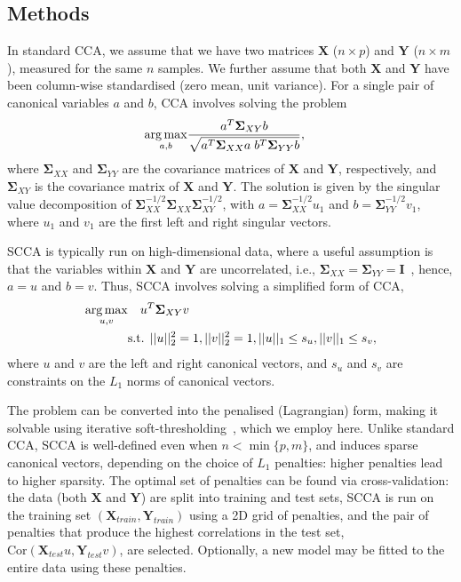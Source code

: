 \documentclass{bioinfo}
\DeclareMathOperator*{\argmax}{arg\,max}
\newcommand{\s}{\mathbf{\Sigma}}
\begin{document}
\vspace*{-12pt}
\begin{methods}
\section{Methods}

In standard CCA, we assume that we have two matrices $\mathbf{X}$ ($n \times p$)
and $\mathbf{Y}$ ($n \times m$), measured for the same $n$ samples.
We further assume that both $\mathbf{X}$ and $\mathbf{Y}$ have been
column-wise standardised (zero mean, unit variance).  For a single pair of 
canonical variables $a$ and $b$, CCA involves solving the problem
\vspace*{-10pt}
\begin{align}
\argmax_{a,b} & \frac{a^T \s_{XY} b}{\sqrt{a^T \s_{XX} a \; b^T \s_{YY} b}},
\label{eqn:cca}
\vspace*{-10pt}
\end{align}
where $\s_{XX}$ and $\s_{YY}$ are the covariance matrices of
$\mathbf{X}$ and $\mathbf{Y}$, respectively, and $\s_{XY}$ is the
covariance matrix of $\mathbf{X}$ and $\mathbf{Y}$. The solution is given by
the singular value decomposition of $\s_{XX}^{-1/2} \s_{XX}
\s_{XY}^{-1/2}$, with $a = \s_{XX}^{-1/2} u_1$ and $b =
\s_{YY}^{-1/2} v_1$, where $u_1$ and $v_1$ are the first left and right
singular vectors.

SCCA is typically run on high-dimensional data, where a useful assumption is that
the variables within $\mathbf{X}$ and $\mathbf{Y}$ are uncorrelated,
i.e., $\s_{XX}=\s_{YY}=\mathbf{I}$~\citep{Parkhomenko2009},
hence, $a = u$ and $b = v$. Thus, SCCA involves solving a simplified form of CCA,
\begin{align}
\argmax_{u,v} &  \quad u^T \s_{XY} v \notag \\
 & \mbox{s.t. } ||u||_2^2=1, ||v||_2^2 = 1, ||u||_1 \le s_u, ||v||_1 \le s_v,
\label{eqn:scca}\vspace*{-10pt}
\end{align}
where $u$ and $v$ are the left and right canonical vectors, 
and $s_u$ and $s_v$ are constraints on the $L_1$ norms
of canonical vectors.

The problem can be converted into the penalised (Lagrangian) form, making it
solvable using iterative soft-thresholding~\citep{Parkhomenko2009}, which we
employ here.  Unlike standard CCA, SCCA is well-defined even when $n{<}\min
\{p, m\}$, and induces sparse canonical vectors, depending on the choice of
$L_1$ penalties: higher penalties lead to higher sparsity. The optimal set
of penalties can be found via cross-validation: the data (both $\mathbf{X}$
and $\mathbf{Y}$) are split into training and test sets, SCCA is run on the
training set $(\mathbf{X}_{train}, \mathbf{Y}_{train})$ using a 2D grid of
penalties, and the pair of penalties that produce the highest correlations
in the test set, $\mbox{Cor}(\mathbf{X}_{test} u, \mathbf{Y}_{test} v)$,
are selected.  Optionally, a new model may be fitted to the entire data
using these penalties.


\end{methods}
\end{document}
